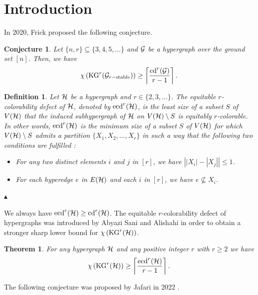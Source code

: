 \documentclass[11pt]{article}
\newtheorem{precon}{{\bf Conjecture}}
\newenvironment{con}{\begin{precon}{\hspace{-0.5
               em}{\bf.\ }}}{\end{precon}}
\newtheorem{predefin}{{\bf Definition}}
\newenvironment{defin}[1]{\begin{predefin}{\hspace{-0.5
                   em}{\bf.\ }}{\rm #1}\hfill{$\blacktriangle$}}{\end{predefin}}
\newtheorem{prethm}{{\bf Theorem}}
\newenvironment{thm}{\begin{prethm}{\hspace{-0.5
               em}{\bf.\ }}}{\end{prethm}}
\begin{document}
\section{Introduction}


In 2020, Frick \cite{Frick2020} proposed the following conjecture.

\begin{con} \cite{Frick2020} \label{FrickConjecture}
	Let $\{n,r\} \subseteq \{3,4,5, \dots \}$ and ${\cal G}$ be a hypergraph over the
	ground set $[n]$. Then, we have
	$$ \chi \left({\rm KG}^r ({\cal G}_{r-{\rm stable}})\right) \geq
	\left\lceil  \frac{{\rm cd}^r ({\cal G})}{r-1}   \right\rceil . $$
\end{con}

\begin{defin}{
		Let ${\cal H}$ be a hypergraph and $r \in \{2,3, \dots\}$.
		{\it The equitable $r$-colorability defect} of ${\cal H}$, denoted by ${\rm ecd}^{r} ({\cal H})$,
		is the least size of a subset $S$ of $V({\cal H})$ that the induced subhypergraph of ${\cal H}$
		on $V({\cal H}) \setminus S$ is equitably $r$-colorable.
		In other words, ${\rm ecd}^{r} ({\cal H})$ is the minimum size of a subset $S$ of $V({\cal H})$ for which $V({\cal H}) \setminus S$
		admits a partition $\{X_{1} , X_{2} , \dots , X_{r}\}$ in such a way that the following two conditions are
		fulfilled :
		\begin{itemize}
			\item For any two distinct elements $i$ and $j$ in $[r]$, we have $ \left|   \left| X_{i} \right|  -   \left| X_{j} \right|     \right|  \leq 1$.
			\item For each hyperedge $e$ in $E({\cal H})$ and each $i$ in $[r]$, we have $e \nsubseteq X_{i}$.		
		\end{itemize}
	}		
\end{defin}

\noindent We always have ${\rm ecd}^{r} ({\cal H}) \geq {\rm cd}^{r} ({\cal H})$. The equitable $r$-colorability defect of hypergraphs was introduced by
Abyazi Sani and Alishahi in order to obtain a stronger sharp lower bound for
$\chi \left(   {\rm KG}^{r} ({\cal H})    \right)$.
\begin{thm} \cite{AbAl}
	For any hypergraph ${\cal H}$ and any positive integer $r$ with $r\geq 2$ we have
	$$\chi \left(   {\rm KG}^{r} ({\cal H})    \right) \geq
	\left\lceil    \frac{{\rm ecd}^{r} ({\cal H})}{r-1}    \right\rceil .$$
\end{thm}

The following conjecture was proposed by Jafari in 2022 \cite{Jafari2022}.
\end{document}
